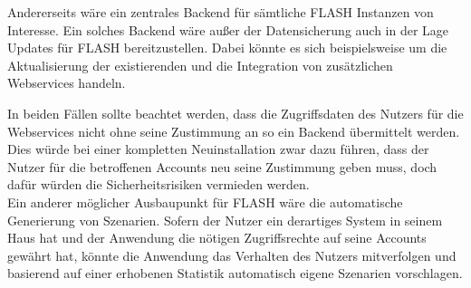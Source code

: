 Andererseits wäre ein zentrales Backend für sämtliche FLASH Instanzen von Interesse. Ein solches Backend wäre außer der Datensicherung auch in der Lage Updates für FLASH bereitzustellen. Dabei könnte es sich beispielsweise um die Aktualisierung der existierenden und die Integration von zusätzlichen Webservices handeln.

In beiden Fällen sollte beachtet werden, dass die Zugriffsdaten des Nutzers für die Webservices nicht ohne seine Zustimmung an so ein Backend übermittelt werden. Dies würde bei einer kompletten Neuinstallation zwar dazu führen, dass der Nutzer für die betroffenen Accounts neu seine Zustimmung geben muss, doch dafür würden die Sicherheitsrisiken vermieden werden.\\

Ein anderer möglicher Ausbaupunkt für FLASH wäre die automatische Generierung von Szenarien. Sofern der Nutzer ein derartiges System in seinem Haus hat und der Anwendung die nötigen Zugriffsrechte auf seine Accounts gewährt hat, könnte die Anwendung das Verhalten des Nutzers mitverfolgen und basierend auf einer erhobenen Statistik automatisch eigene Szenarien vorschlagen.